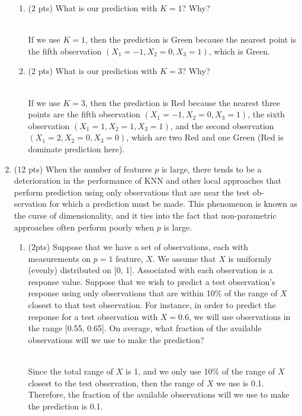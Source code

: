 \documentclass[a4paper]{article}
\theoremstyle{definition}
\newenvironment{soln}{
    \leavevmode\color{blue}\ignorespaces
}{}
\begin{document}
\begin{enumerate}
\begin{enumerate}
	\item (2 pts) What is our prediction with $K=1$? Why?
	
	\begin{soln}\\
	If we use $K=1$, then the prediction is Green because the nearest point is the fifth observation $(X_1 =-1, X_2 = 0, X_3 = 1)$, which is Green. \\
	\end{soln}
	
	\item (2 pts) What is our prediction with $K=3$? Why?
	
	\begin{soln}\\
	If we use $K=3$, then the prediction is Red because the nearest three points are the fifth observation $(X_1 =-1, X_2 = 0, X_3 = 1)$, the sixth observation $(X_1 =1, X_2 = 1, X_3 = 1)$, and the second observation $(X_1 =2, X_2 = 0, X_3 = 0)$, which are two Red and one Green (Red is dominate prediction here).
	\end{soln}

\end{enumerate}

\item (12 pts) When the number of features $p$ is large, there tends to be a deterioration in the performance of KNN and other local approaches that perform prediction using only observations that are near the test ob- servation for which a prediction must be made. This phenomenon is known as the curse of dimensionality, and it ties into the fact that non-parametric approaches often perform poorly when $p$ is large.

\begin{enumerate}
	\item (2pts) Suppose that we have a set of observations, each with measurements on $p=1$ feature, $X$. We assume that $X$ is uniformly (evenly) distributed on [0, 1]. Associated with each observation is a response value. Suppose that we wish to predict a test observation’s response using only observations that are within 10\% of the range of $X$ closest to that test observation. For instance, in order to predict the response for a test observation with $X=0.6$, we will use observations in the range [0.55, 0.65]. On average, what fraction of the available observations will we use to make the prediction?
	
	\begin{soln}\\
	Since the total range of $X$ is 1, and we only use 10\% of the range of $X$ closest to the test observation, then the range of $X$ we use is 0.1. Therefore, the fraction of the available observations will we use to make the prediction is 0.1.
	\end{soln}
	

\end{enumerate}
\end{enumerate}
\end{document}
